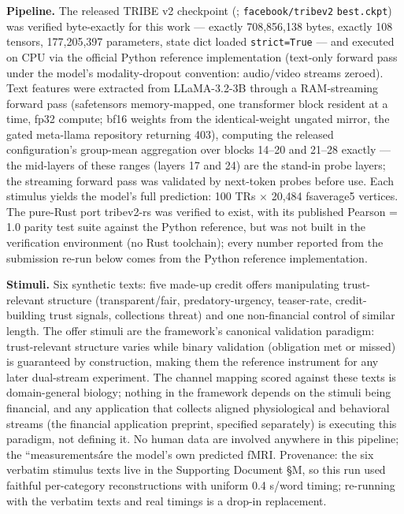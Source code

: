 \documentclass[
]{article}
\begin{document}
\textbf{Pipeline.} The released TRIBE v2 checkpoint (;
\texttt{facebook/tribev2} \texttt{best.ckpt}) was verified byte-exactly
for this work --- exactly 708,856,138 bytes, exactly 108 tensors,
177,205,397 parameters, state dict loaded \texttt{strict=True} --- and
executed on CPU via the official Python reference implementation
(text-only forward pass under the model's modality-dropout convention:
audio/video streams zeroed). Text features were extracted from
LLaMA-3.2-3B through a RAM-streaming forward pass (safetensors
memory-mapped, one transformer block resident at a time, fp32 compute;
bf16 weights from the identical-weight ungated mirror, the gated
meta-llama repository returning 403), computing the released
configuration's group-mean aggregation over blocks 14--20 and 21--28
exactly --- the mid-layers of these ranges (layers 17 and 24) are the
stand-in probe layers; the streaming forward pass was validated by
next-token probes before use. Each stimulus yields the model's full
prediction: 100 TRs \(\times\) 20,484 fsaverage5 vertices. The pure-Rust
port tribev2-rs was verified to exist, with its published Pearson = 1.0
parity test suite against the Python reference, but was not built in the
verification environment (no Rust toolchain); every number reported from
the submission re-run below comes from the Python reference
implementation.

\textbf{Stimuli.} Six synthetic texts: five made-up credit offers
manipulating trust-relevant structure (transparent/fair,
predatory-urgency, teaser-rate, credit-building trust signals,
collections threat) and one non-financial control of similar length. The
offer stimuli are the framework's canonical validation paradigm:
trust-relevant structure varies while binary validation (obligation met
or missed) is guaranteed by construction, making them the reference
instrument for any later dual-stream experiment. The channel mapping
scored against these texts is domain-general biology; nothing in the
framework depends on the stimuli being financial, and any application
that collects aligned physiological and behavioral streams (the
financial application preprint, specified separately) is executing this
paradigm, not defining it. No human data are involved anywhere in this
pipeline; the ``measurementsá́re the model's own predicted fMRI.
Provenance: the six verbatim stimulus texts live in the Supporting
Document §M, so this run used faithful per-category reconstructions with
uniform 0.4 s/word timing; re-running with the verbatim texts and real
timings is a drop-in replacement.
\end{document}

